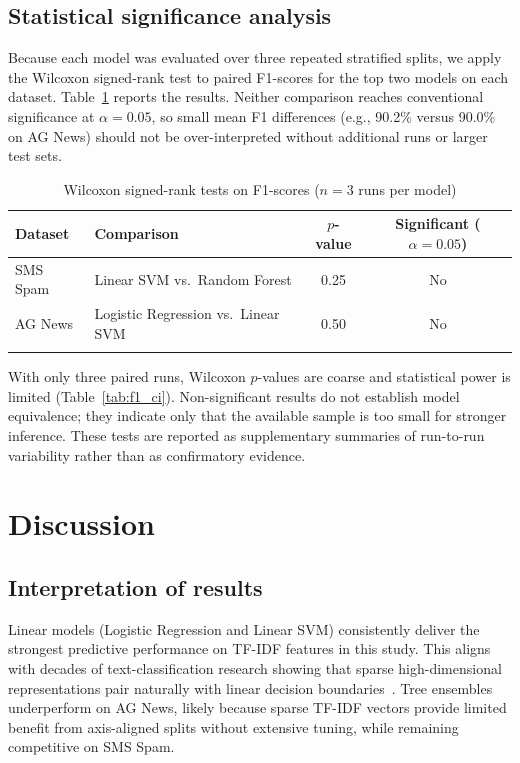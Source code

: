 \documentclass[pdflatex,sn-mathphys-num]{sn-jnl}
\begin{document}
\subsection{Statistical significance analysis}\label{sec:stats}

Because each model was evaluated over three repeated stratified splits, we apply the Wilcoxon signed-rank test to paired F1-scores for the top two models on each dataset. Table~\ref{tab:stats} reports the results. Neither comparison reaches conventional significance at $\alpha=0.05$, so small mean F1 differences (e.g., 90.2\% versus 90.0\% on AG News) should not be over-interpreted without additional runs or larger test sets.

\begin{table}[t]
\caption{Wilcoxon signed-rank tests on F1-scores ($n=3$ runs per model)}\label{tab:stats}
\begin{tabular}{@{}llcc@{}}
\toprule
Dataset & Comparison & $p$-value & Significant ($\alpha=0.05$) \\
\midrule
SMS Spam & Linear SVM vs.\ Random Forest & 0.25 & No \\
AG News & Logistic Regression vs.\ Linear SVM & 0.50 & No \\
\botrule
\end{tabular}
\end{table}

With only three paired runs, Wilcoxon $p$-values are coarse and statistical power is limited (Table~\ref{tab:f1_ci}). Non-significant results do not establish model equivalence; they indicate only that the available sample is too small for stronger inference. These tests are reported as supplementary summaries of run-to-run variability rather than as confirmatory evidence.

\section{Discussion}\label{sec:discussion}

\subsection{Interpretation of results}

Linear models (Logistic Regression and Linear SVM) consistently deliver the strongest predictive performance on TF-IDF features in this study. This aligns with decades of text-classification research showing that sparse high-dimensional representations pair naturally with linear decision boundaries~\cite{joachims1998text,sebastiani2002machine}. Tree ensembles underperform on AG News, likely because sparse TF-IDF vectors provide limited benefit from axis-aligned splits without extensive tuning, while remaining competitive on SMS Spam.
\end{document}
